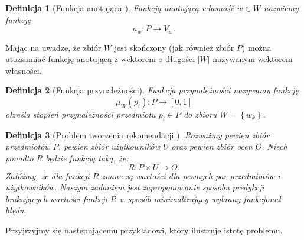 \documentclass[12pt,a4paper]{report}
\newtheorem{df}{Definicja}[chapter]
\newcommand{\set}[1]{\left\lbrace {#1} \right\rbrace}
\newcommand{\setUzytkownicy}{\mathit{U}}
\newcommand{\setPrzedmioty}{\mathit{P}}
\newcommand{\setOceny}{\mathit{O}}
\newcommand{\setWlasnosci}{\mathit{W}}
\begin{document}
\begin{df}[Funkcja anotująca {\citep[Sec 1.3]{kidzinski}}]
Funkcją anotującą własność $w \in \setWlasnosci$ nazwiemy funkcję 
$$
a_w \colon \setPrzedmioty \to V_w.
$$
\end{df}

Mając na uwadze, że zbiór $\setWlasnosci$ jest skończony (jak również zbiór $\setPrzedmioty$) można utożsamiać funkcję anotującą z wektorem o długości $|\setWlasnosci|$ nazywanym wektorem własności.

\begin{df}[Funkcja przynależności]
Funkcja przynależności nazywamy funkcję
$$
\mu_{\setWlasnosci}(p_i): \setPrzedmioty \to [0,1]
$$
określa stopień przynależności przedmiotu $p_i \in \setPrzedmioty$ do zbioru $\setWlasnosci=\set{w_k}$.
\end{df}

\begin{df}[Problem tworzenia rekomendacji {\citep[Sec 1.3]{kidzinski}}]
Rozważmy pewien zbiór przedmiotów $\setPrzedmioty$, pewien zbiór użytkowników $\setUzytkownicy$ oraz pewien zbiór ocen $\setOceny$. Niech ponadto $R$ będzie funkcją taką, że:
$$ 
R: \setPrzedmioty \times \setUzytkownicy \to \setOceny .
$$
Załóżmy, że dla funkcji $R$ znane są wartości dla pewnych par przedmiotów i użytkowników. Naszym zadaniem jest zaproponowanie sposobu predykcji brakujących wartości funkcji $R$ w sposób minimalizujący wybrany funkcjonał błędu. 
\end{df}

Przyjrzyjmy się następującemu przykładowi, który ilustruje istotę problemu.
\end{document}
